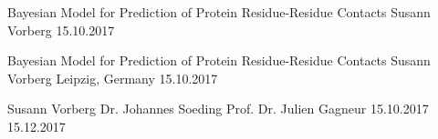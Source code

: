 



\frontmatter

\LMUCover
	{Bayesian Model for Prediction of Protein Residue-Residue Contacts}
	{Susann Vorberg}
	{15.10.2017}

\newpage
\thispagestyle{empty}
\cleardoublepage

\LMUTitlePage
	{Bayesian Model for Prediction of Protein Residue-Residue Contacts}
	{Susann Vorberg}
	{Leipzig, Germany}
	{15.10.2017}

\newpage
\thispagestyle{empty}
\cleardoublepage

\frontmatter\setcounter{page}{1}
\LMUErklaerung
	{Susann Vorberg}
	{Dr. Johannes Soeding}
	{Prof. Dr. Julien Gagneur}
	{15.10.2017}
	{15.12.2017}

\newpage
\thispagestyle{empty}
\cleardoublepage

